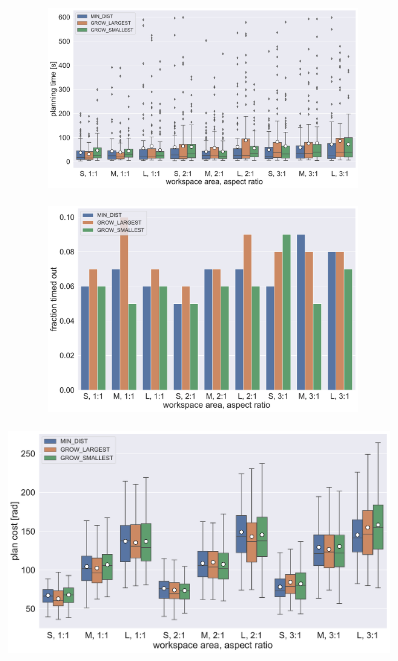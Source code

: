 \begin{figure}
	\centering
	\begin{subfigure}[b]{\textwidth}
		\centering
		\includegraphics[width=0.9\textwidth]{figures/plots/AFBS_time.pdf}
		\caption{}
		\label{fig:AFBS_time}
	\end{subfigure}
	
	\begin{subfigure}[b]{\textwidth}
		\centering
		\includegraphics[width=0.9\textwidth]{figures/plots/AFBS_timeout.pdf}
		\caption{}
		\label{fig:AFBS_timeout}
	\end{subfigure}
	\caption[]{}
	\label{fig:AFBS_timestats}
\end{figure}

\begin{figure}
	\centering
	\includegraphics[width=0.9\textwidth]{figures/plots/AFBS_cost.pdf}
	\caption[]{}
	\label{fig:AFBS_cost}
\end{figure}

